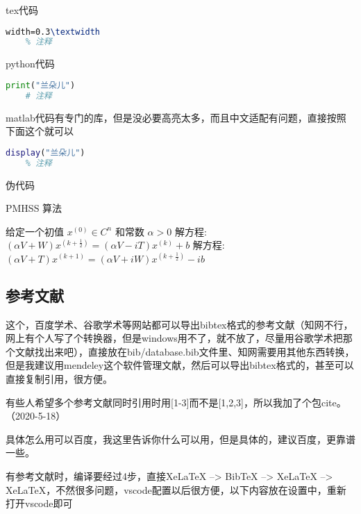 \documentclass[AutoFakeBold]{LZUThesis}
\begin{document}
tex代码
\begin{lstlisting}[language = tex]
    width=0.3\textwidth
    % 注释
\end{lstlisting}

python代码
\begin{lstlisting}[language = python]
    print("兰朵儿")
    # 注释
\end{lstlisting}

matlab代码有专门的库，但是没必要高亮太多，而且中文适配有问题，直接按照下面这个就可以
\begin{lstlisting}[language = matlab]
    display("兰朵儿")
    % 注释
\end{lstlisting}


伪代码

\begin{algorithm}[H]
    \caption{PMHSS 算法\label{Alg:PMHSS}}
    \begin{algorithmic}[1]
      \State 给定一个初值 $ x^{(0)} \in C^{n} $  和常数 $\alpha>0$
      \State 解方程: $(\alpha V+W)x^{(k+\frac{1}{2})}=(\alpha V-i T)x^{(k)}+b $
      \State 解方程: $(\alpha V+T)x^{(k+1)}=(\alpha V+i W)x^{(k+\frac{1}{2})}-i b$
      \EndFor
    \end{algorithmic}
\end{algorithm}

\subsection{参考文献} %
\label{sub:参考文献}

这个，百度学术、谷歌学术等网站都可以导出bibtex格式的参考文献（知网不行，网上有个人写了个转换器，但是windows用不了，就不放了，尽量用谷歌学术把那个文献找出来吧），直接放在bib/database.bib文件里、知网需要用其他东西转换，但是我建议用mendeley这个软件管理文献，然后可以导出bibtex格式的，甚至可以直接复制引用，很方便\cite{partl2016, tenne1992polyhedral, tussyadiah2015hotels}。

有些人希望多个参考文献同时引用时用[1-3]而不是[1,2,3]，所以我加了个包cite。（2020-5-18）

具体怎么用可以百度，我这里告诉你什么可以用，但是具体的，建议百度，更靠谱一些。


有参考文献时，编译要经过4步，直接XeLaTeX --> BibTeX --> XeLaTeX --> XeLaTeX，不然很多问题，vscode配置以后很方便，以下内容放在设置中，重新打开vscode即可
\end{document}
